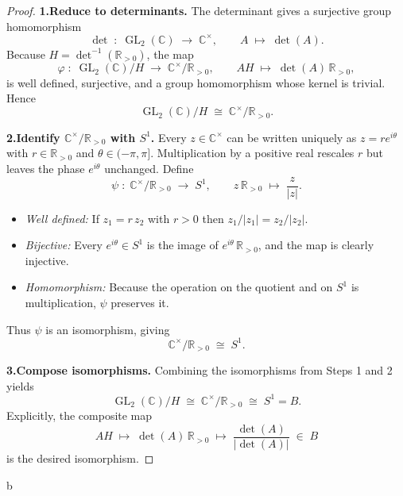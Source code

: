 \documentclass[12pt]{article}
\theoremstyle{definition} %
\theoremstyle{plain} %
\begin{document}
      \begin{proof}
      \textbf{1.\;Reduce to determinants.}
      The determinant gives a surjective group homomorphism
      \[
         \det \;:\;
         \operatorname{GL}_{2}(\mathbb{C}) \;\longrightarrow\;
         \mathbb{C}^{\times},
         \qquad
         A \;\longmapsto\; \det(A).
      \]
      Because \(H=\det^{-1}(\mathbb{R}_{>0})\), the map
      \[
         \varphi \;:\;
         \operatorname{GL}_{2}(\mathbb{C})/H
         \;\longrightarrow\;
         \mathbb{C}^{\times}/\mathbb{R}_{>0},
         \qquad
         AH \;\longmapsto\; \det(A)\,\mathbb{R}_{>0},
      \]
      is well defined, surjective, and a group homomorphism whose kernel is
      trivial.  Hence
      \[
         \operatorname{GL}_{2}(\mathbb{C})/H
         \;\cong\;
         \mathbb{C}^{\times}/\mathbb{R}_{>0}.
      \]
      
      \smallskip
      \textbf{2.\;Identify \(\mathbb{C}^{\times}/\mathbb{R}_{>0}\) with \(S^{1}\).}
      Every \(z\in\mathbb{C}^{\times}\) can be written uniquely as
      \(z=re^{i\theta}\) with \(r\in\mathbb{R}_{>0}\) and \(\theta\in(-\pi,\pi]\).
      Multiplication by a positive real rescales \(r\) but leaves the phase
      \(e^{i\theta}\) unchanged.  Define
      \[
         \psi \;:\;
         \mathbb{C}^{\times}/\mathbb{R}_{>0}
         \;\longrightarrow\;
         S^{1},
         \qquad
         z\,\mathbb{R}_{>0}
         \;\longmapsto\;
         \frac{z}{|z|}.
      \]
      \begin{itemize}
        \item \emph{Well defined:}  If \(z_{1}=r\,z_{2}\) with \(r>0\) then
              \(z_{1}/|z_{1}|=z_{2}/|z_{2}|\).
        \item \emph{Bijective:}  Every \(e^{i\theta}\in S^{1}\) is the image
              of \(e^{i\theta}\,\mathbb{R}_{>0}\), and the map is clearly
              injective.
        \item \emph{Homomorphism:}  Because the operation on the quotient and
              on \(S^{1}\) is multiplication, $\psi$ preserves it.
      \end{itemize}
      Thus \(\psi\) is an isomorphism, giving
      \[
         \mathbb{C}^{\times}/\mathbb{R}_{>0} \;\cong\; S^{1}.
      \]
      
      \smallskip
      \textbf{3.\;Compose isomorphisms.}
      Combining the isomorphisms from Steps 1 and 2 yields
      \[
         \operatorname{GL}_{2}(\mathbb{C})/H
         \;\cong\;
         \mathbb{C}^{\times}/\mathbb{R}_{>0}
         \;\cong\;
         S^{1}=B.
      \]
      Explicitly, the composite map
      \[
         AH
         \;\longmapsto\;
         \det(A)\,\mathbb{R}_{>0}
         \;\longmapsto\;
         \frac{\det(A)}{|\det(A)|}\;\in\;B
      \]
      is the desired isomorphism.
      
      \end{proof}b
\end{document}
